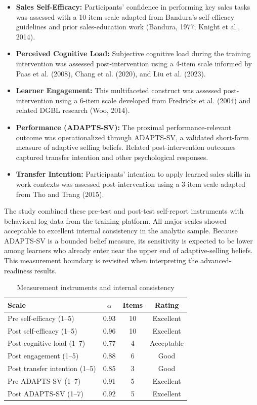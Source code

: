 \documentclass[12pt]{report}
\begin{document}
\begin{itemize}[leftmargin=1.2cm]
    \item \textbf{Sales Self-Efficacy:} Participants' confidence in performing key sales tasks was assessed with a 10-item scale adapted from Bandura's self-efficacy guidelines and prior sales-education work (Bandura, 1977; Knight et al., 2014).
    \item \textbf{Perceived Cognitive Load:} Subjective cognitive load during the training intervention was assessed post-intervention using a 4-item scale informed by Paas et al. (2008), Chang et al. (2020), and Liu et al. (2023).
    \item \textbf{Learner Engagement:} This multifaceted construct was assessed post-intervention using a 6-item scale developed from Fredricks et al. (2004) and related DGBL research (Woo, 2014).
    \item \textbf{Performance (ADAPTS-SV):} The proximal performance-relevant outcome was operationalized through ADAPTS-SV, a validated short-form measure of adaptive selling beliefs. Related post-intervention outcomes captured transfer intention and other psychological responses.
    \item \textbf{Transfer Intention:} Participants' intention to apply learned sales skills in work contexts was assessed post-intervention using a 3-item scale adapted from Tho and Trang (2015).
\end{itemize}

The study combined these pre-test and post-test self-report instruments with behavioral log data from the training platform. All major scales showed acceptable to excellent internal consistency in the analytic sample.
Because ADAPTS-SV is a bounded belief measure, its sensitivity is expected to be lower among learners who already enter near the upper end of adaptive-selling beliefs. This measurement boundary is revisited when interpreting the advanced-readiness results.

\begin{table}[htbp]
\centering
\caption{Measurement instruments and internal consistency}
\begin{tabular}{p{6.7cm}ccc}
\toprule
\textbf{Scale} & \textbf{$\alpha$} & \textbf{Items} & \textbf{Rating} \\
\midrule
Pre self-efficacy (1--5) & 0.93 & 10 & Excellent \\
Post self-efficacy (1--5) & 0.96 & 10 & Excellent \\
Post cognitive load (1--7) & 0.77 & 4 & Acceptable \\
Post engagement (1--5) & 0.88 & 6 & Good \\
Post transfer intention (1--5) & 0.85 & 3 & Good \\
Pre ADAPTS-SV (1--7) & 0.91 & 5 & Excellent \\
Post ADAPTS-SV (1--7) & 0.92 & 5 & Excellent \\
\bottomrule
\end{tabular}
\end{table}
\end{document}
